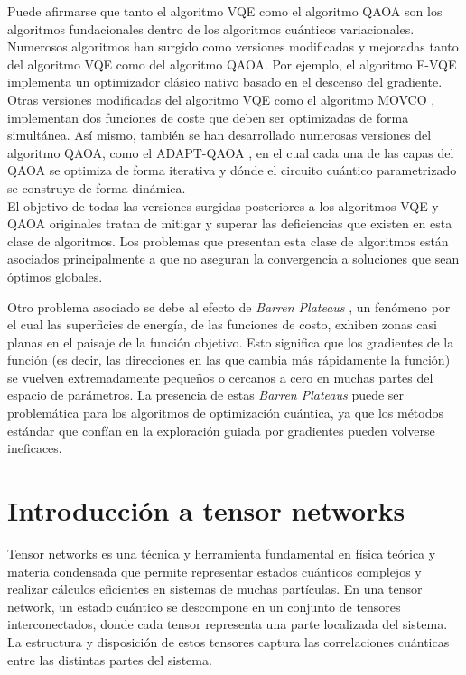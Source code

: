 Puede afirmarse que tanto el algoritmo VQE como el algoritmo QAOA son los algoritmos fundacionales dentro de los algoritmos cuánticos variacionales. Numerosos algoritmos han surgido como versiones modificadas y mejoradas tanto del algoritmo VQE como del algoritmo QAOA. Por ejemplo, el algoritmo F-VQE \citep{amaro} implementa un optimizador clásico nativo basado en el descenso del gradiente. Otras versiones modificadas del algoritmo VQE como el algoritmo MOVCO \citep{luis}, implementan dos funciones de coste que deben ser optimizadas de forma simultánea. Así mismo, también se han desarrollado numerosas versiones del algoritmo QAOA, como el ADAPT-QAOA \citep{zhu}, en el cual cada una de las capas del QAOA se optimiza de forma iterativa y dónde el circuito cuántico parametrizado se construye de forma dinámica. \\

El objetivo de todas las versiones surgidas posteriores a los algoritmos VQE y QAOA originales tratan de mitigar y superar las deficiencias que existen en esta clase de algoritmos. Los problemas que presentan esta clase de algoritmos están asociados principalmente a que no aseguran la convergencia a soluciones que sean óptimos globales.

\newpage

Otro problema asociado se debe al efecto de \textit{Barren Plateaus} \citep{mcClean}, un fenómeno por el cual las superficies de energía, de las funciones de costo, exhiben zonas casi planas en el paisaje de la función objetivo. Esto significa que los gradientes de la función (es decir, las direcciones en las que cambia más rápidamente la función) se vuelven extremadamente pequeños o cercanos a cero en muchas partes del espacio de parámetros. La presencia de estas \textit{Barren Plateaus} puede ser problemática para los algoritmos de optimización cuántica, ya que los métodos estándar que confían en la exploración guiada por gradientes pueden volverse ineficaces. 

\section{Introducción a tensor networks}


Tensor networks \citep{orus} es una técnica y herramienta fundamental en física teórica y materia condensada que permite representar estados cuánticos complejos y realizar cálculos eficientes en sistemas de muchas partículas. En una tensor network, un estado cuántico se descompone en un conjunto de tensores interconectados, donde cada tensor representa una parte localizada del sistema. La estructura y disposición de estos tensores captura las correlaciones cuánticas entre las distintas partes del sistema. \\

